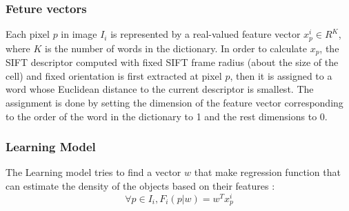 \subsubsection{Feture vectors} 

Each pixel $p$ in image $I_i$ is represented by a real-valued feature vector $x^i_p \in R^K$, where $K$ is the number of words in the dictionary. In order to calculate $x_p$, the SIFT descriptor computed with fixed SIFT frame radius (about the size of the cell) and fixed orientation is first extracted at pixel $p$, then it is assigned to a word whose Euclidean distance to the current descriptor is smallest. The assignment is done by setting the dimension of the feature vector corresponding to the order of the word in the dictionary to 1 and the rest dimensions to 0.


\subsubsection{Learning Model}

The Learning model tries to find a vector $w$ that make regression function that can estimate the density of the objects based on their features : \\

\begin{displaymath}
    \forall p \in I_i, F_i(p|w) = w^{T}x^i_p
\end{displaymath}

